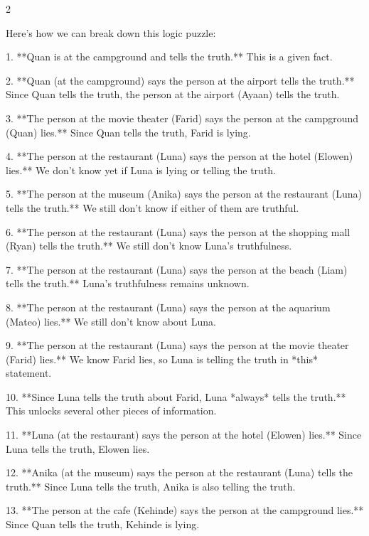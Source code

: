 \begin{paracol}{2}
\switchcolumn[0]
\begin{tcolorbox}[breakable, colframe=mydarkgreen!70, colback=mydarkgreen!10, title=Correct response]
Here's how we can break down this logic puzzle:

1. **Quan is at the campground and tells the truth.** This is a given fact.

2. **Quan (at the campground) says the person at the airport tells the truth.** Since Quan tells the truth, the person at the airport (Ayaan) tells the truth.

3. **The person at the movie theater (Farid) says the person at the campground (Quan) lies.** Since Quan tells the truth, Farid is lying.

4. **The person at the restaurant (Luna) says the person at the hotel (Elowen) lies.**  We don't know yet if Luna is lying or telling the truth.

5. **The person at the museum (Anika) says the person at the restaurant (Luna) tells the truth.** We still don't know if either of them are truthful.

6. **The person at the restaurant (Luna) says the person at the shopping mall (Ryan) tells the truth.** We still don't know Luna's truthfulness.

7. **The person at the restaurant (Luna) says the person at the beach (Liam) tells the truth.** Luna's truthfulness remains unknown.

8. **The person at the restaurant (Luna) says the person at the aquarium (Mateo) lies.**  We still don't know about Luna.

9. **The person at the restaurant (Luna) says the person at the movie theater (Farid) lies.**  We know Farid lies, so Luna is telling the truth in *this* statement.

10. **Since Luna tells the truth about Farid, Luna *always* tells the truth.**  This unlocks several other pieces of information.

11. **Luna (at the restaurant) says the person at the hotel (Elowen) lies.** Since Luna tells the truth, Elowen lies.

12. **Anika (at the museum) says the person at the restaurant (Luna) tells the truth.**  Since Luna tells the truth, Anika is also telling the truth.

13. **The person at the cafe (Kehinde) says the person at the campground lies.** Since Quan tells the truth, Kehinde is lying.



\end{tcolorbox}
\end{paracol}
